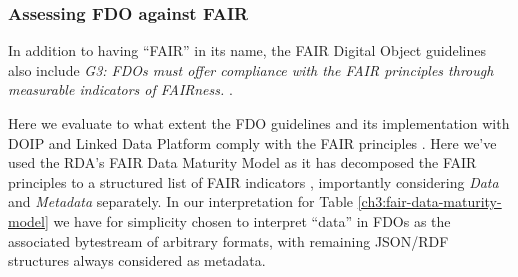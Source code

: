 \hypertarget{ch3:fair-compare}{%
\subsubsection{Assessing FDO against FAIR}\label{ch3:fair-compare}}

In addition to having ``FAIR'' in its name, the FAIR Digital Object guidelines \cite{fdo-RequirementSpec} also include \emph{G3: FDOs must offer compliance with the FAIR principles through measurable indicators of FAIRness.} .

Here we evaluate to what extent the FDO guidelines and its implementation with DOIP and Linked Data Platform \cite{FDOFramework} comply with the FAIR principles \cite{wilkinsonFAIRGuidingPrinciples2016e}. Here we've used the RDA's FAIR Data Maturity Model \cite{groupFAIRDataMaturity2020} as it has decomposed the FAIR principles to a structured list of FAIR indicators \cite{bahimFAIRDataMaturity2020a}, importantly considering \emph{Data} and \emph{Metadata} separately. In our interpretation for Table \vref{ch3:fair-data-maturity-model} we have for simplicity chosen to interpret ``data'' in FDOs as the associated bytestream of arbitrary formats, with remaining JSON/RDF structures always considered as metadata.

